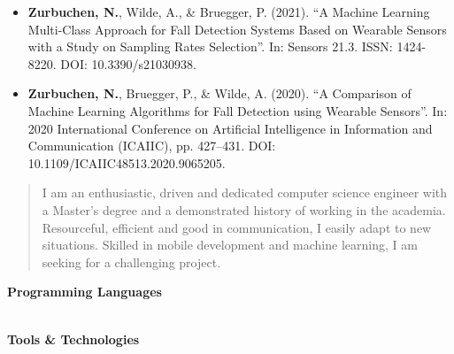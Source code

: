 \documentclass[10pt,a4paper,ragged2e,withhyper,academicons]{altacv}
\begin{document}
\begin{paracol}{2}
\smallskip




\begin{itemize}
	\item \textbf{\color{accent}Zurbuchen, N.}, Wilde, A., \& Bruegger, P. (2021). “A Machine Learning Multi-Class Approach for Fall Detection Systems Based on Wearable Sensors with a Study on Sampling Rates Selection”. In: Sensors 21.3. ISSN: 1424-8220. DOI: 10.3390/s21030938.
	\item \textbf{\color{accent}Zurbuchen, N.}, Bruegger, P., \& Wilde, A. (2020). “A Comparison of Machine Learning Algorithms for Fall Detection using Wearable Sensors”. In: 2020 International Conference on Artificial Intelligence in Information and Communication (ICAIIC), pp. 427–431. DOI: 10.1109/ICAIIC48513.2020.9065205.
\end{itemize}
 


\switchcolumn



\vspace{-0.4cm}
\begin{quote}
\justify I am an enthusiastic, driven and dedicated computer science engineer with a Master's degree and a demonstrated history of working in the academia. Resourceful, efficient and good in communication, I easily adapt to new situations. Skilled in mobile development and machine learning, I am seeking for a challenging project.
\end{quote}

\smallskip




\textbf{\color{accent}Programming Languages}\\\medskip
{}
\\\smallskip
{}

\divider

\textbf{\color{accent}Tools \& Technologies}\\\medskip
{}
\\\smallskip
{}
\\\smallskip
{}
\\\smallskip
{}


\end{paracol}
\end{document}

